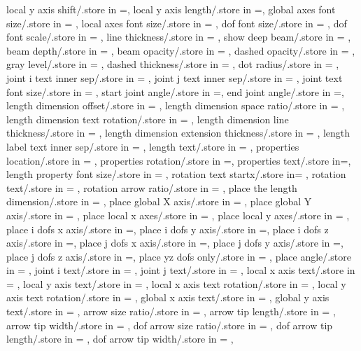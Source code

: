 {local y axis shift/.store in =\localyshift,
local y axis length/.store in =\localylength,
global axes font size/.store in = \globalaxesfontsize,
local axes font size/.store in = \localaxesfontsize,
dof font size/.store in = \doffontsize,
dof font scale/.store in = \doffontscale,
line thickness/.store in = \linethickness,
show deep beam/.store in = \showdeep,
beam depth/.store in = \beamdepth,
beam opacity/.store in = \beamopa,
dashed opacity/.store in = \dashedopa,
gray level/.store in = \graylevel,
dashed thickness/.store in = \dashedthk,
dot radius/.store in = \dotradius,
joint i text inner sep/.store in = \jointinnersepi,
joint j text inner sep/.store in = \jointinnersepj,
joint text font size/.store in = \jointtextfontsize,
start joint angle/.store in =\startjointangle,
end joint angle/.store in =\endjointangle,
length dimension offset/.store in = \lengthdimoffset,
length dimension space ratio/.store in = \lengthdimspaceratio,
length dimension text rotation/.store in = \lengthlabelrotation,
length dimension line thickness/.store in = \lengthdimlinethick,
length dimension extension thickness/.store in = \lengthdimextthick,
length label text inner sep/.store in = \lengthlabeltextinnersep,
length text/.store in = \lengthtext,
properties location/.store in = \propertyloc,
properties rotation/.store in =\propertyrotation,
properties text/.store in=\propertiestext,
length property font size/.store in = \lengthpropfontsize,
rotation text startx/.store in= \rotationanglex,
rotation text/.store in = \rotationtext,
rotation arrow ratio/.store in = \rotationarrowratio,
place the length dimension/.store in = \placelengthdim,
place global X axis/.store in = \placeglobalaxesX,
place global Y axis/.store in = \placeglobalaxesY,
place local x axes/.store in = \placelocalxaxes,
place local y axes/.store in = \placelocalyaxes,
place i dofs x axis/.store in =\placeidofx,
place i dofs y axis/.store in =\placeidofy,
place i dofs z axis/.store in =\placeidofz,
place j dofs x axis/.store in =\placejdofx,
place j dofs y axis/.store in =\placejdofy,
place j dofs z axis/.store in =\placejdofz,
place yz dofs only/.store in = \placeyzdofsonly,
place angle/.store in = \placeangle,
joint i text/.store in = \jointitext,
joint j text/.store in = \jointjtext,
local x axis text/.store in = \localxtext,
local y axis text/.store in = \localytext,
local x axis text rotation/.store in = \localxtextang,
local y axis text rotation/.store in = \localytextang,
global x axis text/.store in = \globalxtext,
global y axis text/.store in = \globalytext,
arrow size ratio/.store in = \arrsizrat,
arrow tip length/.store in = \arrlen,
arrow tip width/.store in = \arrwid,
dof arrow size ratio/.store in = \dofarrtipsizrat,
dof arrow tip length/.store in = \dofarrtiplen,
dof arrow tip width/.store in = \dofarrtipwid,}

